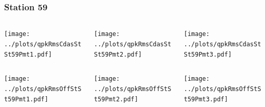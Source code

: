 \documentclass[aspectratio=169]{beamer}
\begin{document}
\begin{frame} 
  \frametitle{Station 59}
  \begin{center}
    \begin{columns}
      \begin{column}{0.33\textwidth}
        \texttt{[image: ../plots/qpkRmsCdasStSt59Pmt1.pdf]}
      \end{column}
      \begin{column}{0.33\textwidth}
        \texttt{[image: ../plots/qpkRmsCdasStSt59Pmt2.pdf]}
      \end{column}
      \begin{column}{0.33\textwidth}
        \texttt{[image: ../plots/qpkRmsCdasStSt59Pmt3.pdf]}
      \end{column}
    \end{columns}
  \end{center}

  \begin{center}
    \begin{columns}
      \begin{column}{0.33\textwidth}
        \texttt{[image: ../plots/qpkRmsOffStSt59Pmt1.pdf]}
      \end{column}
      \begin{column}{0.33\textwidth}
        \texttt{[image: ../plots/qpkRmsOffStSt59Pmt2.pdf]}
      \end{column}
      \begin{column}{0.33\textwidth}
        \texttt{[image: ../plots/qpkRmsOffStSt59Pmt3.pdf]}
      \end{column}
    \end{columns}
  \end{center}
\end{frame}
\end{document}
